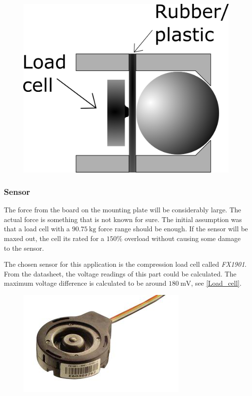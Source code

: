 \begin{figure}[H]
\begin{center}
	\includegraphics[width = .45\textwidth]{Figures/Press_sens_func_2.png}
	\label{Press_sens_prot_2}
\end{center}
\end{figure}

\subsubsection{Sensor}
The force from the board on the mounting plate will be considerably large. The actual force is something that is not known for sure. The initial assumption was that a load cell with a $90.75~\textrm{kg}$ force range should be enough. If the sensor will be maxed out, the cell its rated for a $150\%$ overload without causing some damage to the sensor. 

The chosen sensor for this application is the compression load cell called \emph{FX1901}. 
From the datasheet\cite{load_cell}, the voltage readings of this part could be calculated. The maximum voltage difference is calculated to be around $180~\textrm{mV}$, see \autoref{Load_cell}.
\begin{figure}[H]
\begin{center}
	\includegraphics[width = .45\textwidth]{Figures/Load_cell.png}
	\label{Load_cell}
\end{center}
\end{figure}


